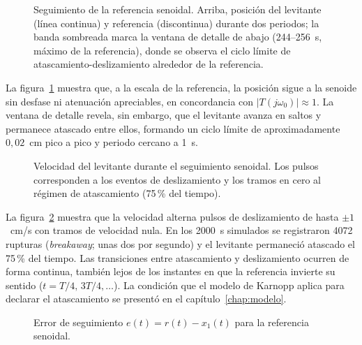 \begin{figure}[ht]
    \centering
    
    \caption[Seguimiento senoidal: posición]{Seguimiento de la referencia senoidal. Arriba, posición del levitante (línea continua) y referencia (discontinua) durante dos periodos; la banda sombreada marca la ventana de detalle de abajo (244--256~s, máximo de la referencia), donde se observa el ciclo límite de atascamiento-deslizamiento alrededor de la referencia.}
    \label{fig:sen_pos}
\end{figure}

La figura~\ref{fig:sen_pos} muestra que, a la escala de la referencia, la posición sigue a la senoide sin desfase ni atenuación apreciables, en concordancia con $|T(j\omega_0)|\approx 1$. La ventana de detalle revela, sin embargo, que el levitante avanza en saltos y permanece atascado entre ellos, formando un ciclo límite de aproximadamente $0{,}02$~cm pico a pico y periodo cercano a 1~s.

\FloatBarrier

\begin{figure}[ht]
    \centering
    
    \caption[Seguimiento senoidal: velocidad]{Velocidad del levitante durante el seguimiento senoidal. Los pulsos corresponden a los eventos de deslizamiento y los tramos en cero al régimen de atascamiento (75\,\% del tiempo).}
    \label{fig:sen_vel}
\end{figure}

La figura~\ref{fig:sen_vel} muestra que la velocidad alterna pulsos de deslizamiento de hasta $\pm 1$~cm/s con tramos de velocidad nula. En los 2000~s simulados se registraron 4072 rupturas (\emph{breakaway}; unas dos por segundo) y el levitante permaneció atascado el 75\,\% del tiempo. Las transiciones entre atascamiento y deslizamiento ocurren de forma continua, también lejos de los instantes en que la referencia invierte su sentido ($t = T/4,\,3T/4,\ldots$). La condición que el modelo de Karnopp aplica para declarar el atascamiento se presentó en el capítulo~\ref{chap:modelo}.

\FloatBarrier

\begin{figure}[ht]
    \centering
    
    \caption[Seguimiento senoidal: error]{Error de seguimiento $e(t)=r(t)-x_1(t)$ para la referencia senoidal.}
    \label{fig:sen_error}
\end{figure}

